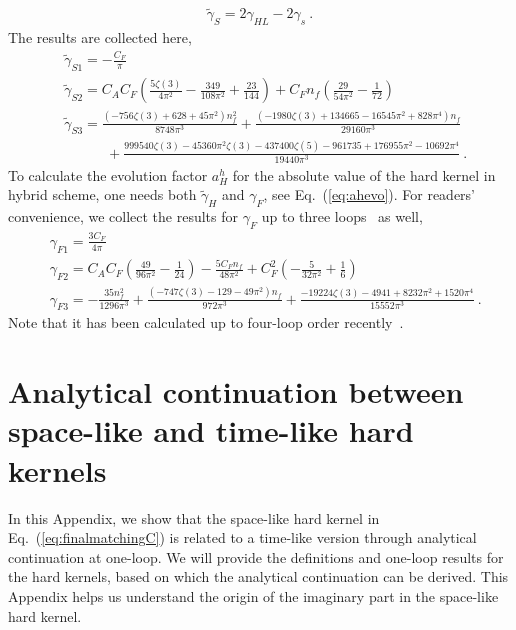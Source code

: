 \documentclass[a4paper,11pt]{article}
\begin{document}
\begin{align}
\tilde \gamma_S = 2 \gamma_{HL} - 2\gamma_s \ .
\end{align}
The results are collected here,
\begin{align}
&\tilde \gamma_{S1} = -\frac{C_F}{\pi } \nonumber\\
&\tilde \gamma_{S2} = 
C_A C_F\left(\frac{5 \zeta (3)}{4 \pi ^2}-\frac{349}{108 \pi ^2}+\frac{23}{144}\right)
+C_F n_f\left(\frac{29}{54 \pi ^2}-\frac{1}{72} \right)\nonumber\\
&\tilde \gamma_{S3}= \frac{\left(-756 \zeta (3)+628+45 \pi ^2\right) n_f^2}{8748 \pi ^3}+\frac{\left(-1980 \zeta(3)+134665-16545 \pi ^2+828 \pi ^4\right) n_f}{29160 \pi ^3} \nonumber\\
&\quad \quad \quad +\frac{999540 \zeta (3)-45360 \pi^2 \zeta (3)-437400 \zeta (5)-961735+176955 \pi ^2-10692 \pi ^4}{19440 \pi ^3} \ .
\end{align}
To calculate the evolution factor $a_H^h$ for the absolute value of the hard kernel in hybrid scheme, one needs both $\tilde \gamma_H$ and $\gamma_F$, see Eq.~(\ref{eq:ahevo}). For readers' convenience, we collect the results for $\gamma_F$ up to three loops~\cite{Ji:1991pr, Chetyrkin:2003vi,Braun:2020ymy} as well,
\begin{align}
&\gamma_{F1} = \frac{3 C_F}{4 \pi } \nonumber\\
&\gamma_{F2} = C_A C_F\left(\frac{49}{96 \pi ^2}-\frac{1}{24}\right)
-\frac{5 C_F n_f}{48 \pi ^2} 
+ C_F^2\left(-\frac{5}{32\pi ^2}+\frac{1}{6}\right) \nonumber\\
&\gamma_{F3} = -\frac{35 n_f^2}{1296\pi^3}+\frac{\left(-747 \zeta (3)-129-49 \pi ^2\right) n_f}{972 \pi ^3}+\frac{-19224 \zeta (3)-4941+8232 \pi ^2+1520 \pi ^4}{15552 \pi ^3} \ .
\end{align}
Note that it has been calculated up to four-loop order recently~\cite{Grozin:2023dlk}.



\iffalse
\section{Analytical continuation between space-like and time-like hard kernels}\label{sec:anatimspa}
In this Appendix, we show that the space-like hard kernel in Eq.~(\ref{eq:finalmatchingC}) is related to a time-like version through analytical continuation at one-loop. We will provide the definitions and one-loop results for the hard kernels, based on which the analytical continuation can be derived. This Appendix helps us understand the origin of the imaginary part in the space-like hard kernel. 
\end{document}
